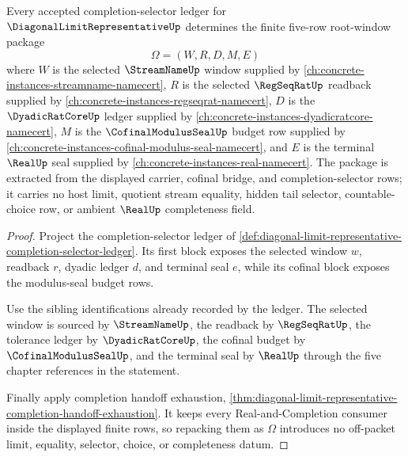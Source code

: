 \begin{theorem}
\label{thm:diagonal-limit-representative-root-window-extraction}
Every accepted completion-selector ledger for $\DiagonalLimitRepresentativeUp$ determines the finite five-row root-window package
$$
\Omega=(W,R,D,M,E)
$$
where $W$ is the selected $\StreamNameUp$ window supplied by \autoref{ch:concrete-instances-streamname-namecert}, $R$ is the selected $\RegSeqRatUp$ readback supplied by \autoref{ch:concrete-instances-regseqrat-namecert}, $D$ is the $\DyadicRatCoreUp$ ledger supplied by \autoref{ch:concrete-instances-dyadicratcore-namecert}, $M$ is the $\CofinalModulusSealUp$ budget row supplied by \autoref{ch:concrete-instances-cofinal-modulus-seal-namecert}, and $E$ is the terminal $\RealUp$ seal supplied by \autoref{ch:concrete-instances-real-namecert}. The package is extracted from the displayed carrier, cofinal bridge, and completion-selector rows; it carries no host limit, quotient stream equality, hidden tail selector, countable-choice row, or ambient $\RealUp$ completeness field.
\end{theorem}
\begin{proof}
Project the completion-selector ledger of \autoref{def:diagonal-limit-representative-completion-selector-ledger}. Its first block exposes the selected window $w$, readback $r$, dyadic ledger $d$, and terminal seal $e$, while its cofinal block exposes the modulus-seal budget rows.

Use the sibling identifications already recorded by the ledger. The selected window is sourced by $\StreamNameUp$, the readback by $\RegSeqRatUp$, the tolerance ledger by $\DyadicRatCoreUp$, the cofinal budget by $\CofinalModulusSealUp$, and the terminal seal by $\RealUp$ through the five chapter references in the statement.

Finally apply completion handoff exhaustion, \autoref{thm:diagonal-limit-representative-completion-handoff-exhaustion}. It keeps every Real-and-Completion consumer inside the displayed finite rows, so repacking them as $\Omega$ introduces no off-packet limit, equality, selector, choice, or completeness datum.
\end{proof}

